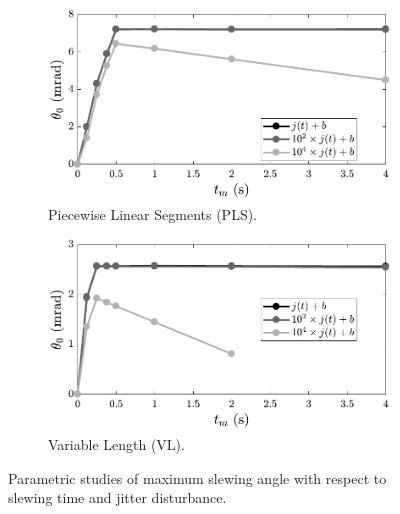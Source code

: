 \begin{figure}[t]
    \centering
    \begin{subfigure}[b]{0.495\textwidth}
      \centering
      \includegraphics[width=\columnwidth]{../ch7/figures/DisturbancePLS.pdf}
      \caption{Piecewise Linear Segments (PLS).}\label{fig:ch7:disturbance_pls}
    \end{subfigure}
    \begin{subfigure}[b]{0.495\textwidth}
      \centering
      \includegraphics[width=\columnwidth]{../ch7/figures/DisturbanceVL.pdf}
      \caption{Variable Length (VL).}\label{fig:ch7:disturbance_vl}
    \end{subfigure}
    \caption{Parametric studies of maximum slewing angle with respect to slewing time and jitter disturbance.\label{fig:ch7:disturbance}}
\end{figure}